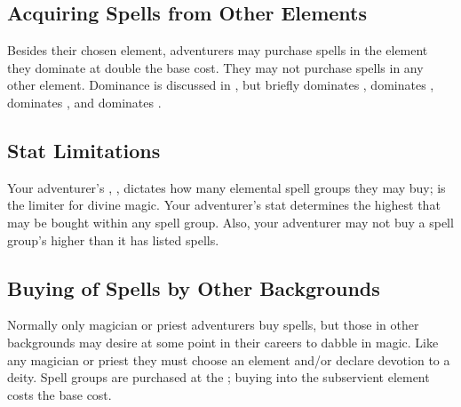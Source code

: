\begin{multicols*}{2}
\subsection{Acquiring Spells from Other Elements}
\label{acquiring-spells-other-elements}
Besides their chosen element, adventurers may purchase spells in the element they dominate at double the base cost. They may not purchase spells in any other element.
Dominance is discussed in , but briefly  dominates ,  dominates ,  dominates , and  dominates . 
\subsection{Stat Limitations}
Your adventurer's \INT, , dictates how many elemental spell groups they may buy; \CSE is the limiter for divine magic. Your adventurer's \PWR stat determines the highest  that may be bought within any spell group. Also, your adventurer may not buy a spell group's  higher than it has listed spells.

\subsection{Buying of Spells by Other Backgrounds}
Normally only magician or priest adventurers buy spells, but those in other backgrounds may desire at some point in their careers to dabble in magic. Like any magician or priest they must choose an element and/or declare devotion to a deity. Spell groups are purchased at  the ; buying into the subservient element costs  the base cost.


\end{multicols*}
